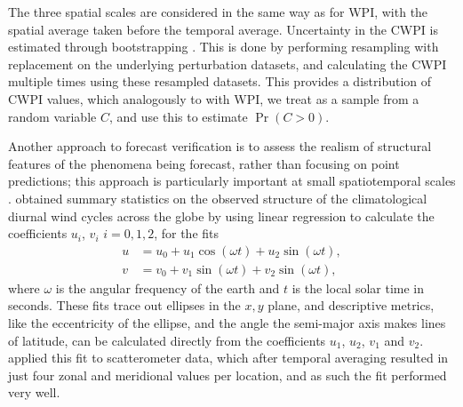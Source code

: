 \documentclass[twocol]{ametsoc}
\DeclareMathOperator{\pr}{Pr}
\begin{document}
The three spatial scales are considered in the same way as for WPI, with the spatial average taken before the temporal average. Uncertainty in the CWPI is estimated through bootstrapping \citep{efron79}. This is done by performing resampling with replacement on the underlying perturbation datasets, and calculating the CWPI multiple times using these resampled datasets. This provides a distribution of CWPI values, which analogously to with WPI, we treat as a sample from a random variable $C$, and use this to estimate $\pr\left(C > 0\right)$.

Another approach to forecast verification is to assess the realism of structural features of the phenomena being forecast, rather than focusing on point predictions; this approach is particularly important at small spatiotemporal scales \citep[e.g.][]{mass02, rife05}. \citet{gille05} obtained summary statistics on the observed structure of the climatological diurnal wind cycles across the globe by using linear regression to calculate the coefficients $u_i$, $v_i$ $i=0,1,2$, for the fits 
\begin{align}
u &= u_0 + u_1 \cos(\omega t) + u_2 \sin(\omega t), \label{Eq:u_h} \\
v &= v_0 + v_1 \sin(\omega t) + v_2 \sin(\omega t), \label{Eq:v_h}
\end{align}
where $\omega$ is the angular frequency of the earth and $t$ is the local solar time in seconds. These fits trace out ellipses in the $x,y$ plane, and descriptive metrics, like the eccentricity of the ellipse, and the angle the semi-major axis makes lines of latitude, can be calculated directly from the coefficients $u_1$, $u_2$, $v_1$ and $v_2$. \citet{gille05} applied this fit to scatterometer data, which after temporal averaging resulted in just four zonal and meridional values per location, and as such the fit performed very well.  
\end{document}
